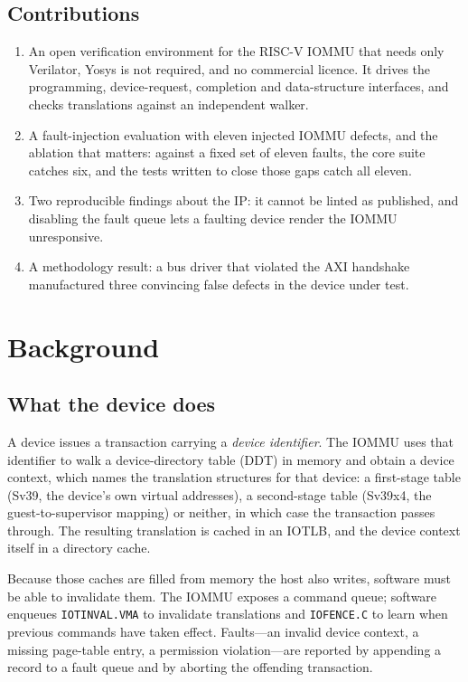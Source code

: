 \documentclass[journal]{IEEEtran}
\newcommand{\cmd}[1]{\mbox{\texttt{#1}}}
\begin{document}
\subsection{Contributions}
\begin{enumerate}
\item An open verification environment for the RISC-V IOMMU that needs only
      Verilator, Yosys is not required, and no commercial licence. It drives the
      programming, device-request, completion and data-structure interfaces, and
      checks translations against an independent walker.
\item A fault-injection evaluation with eleven injected IOMMU defects, and the
      ablation that matters: against a fixed set of eleven faults, the core
      suite catches six, and the tests written to close those gaps catch all
      eleven.
\item Two reproducible findings about the IP: it cannot be linted as published,
      and disabling the fault queue lets a faulting device render the IOMMU
      unresponsive.
\item A methodology result: a bus driver that violated the AXI handshake
      manufactured three convincing false defects in the device under test.
\end{enumerate}

\section{Background}

\subsection{What the device does}
A device issues a transaction carrying a \emph{device identifier}. The IOMMU
uses that identifier to walk a device-directory table (DDT) in memory and
obtain a device context, which names the translation structures for that device:
a first-stage table (Sv39, the device's own virtual addresses), a second-stage
table (Sv39x4, the guest-to-supervisor mapping) or neither, in which case the
transaction passes through. The resulting translation is cached in an IOTLB, and
the device context itself in a directory cache.

Because those caches are filled from memory the host also writes, software must
be able to invalidate them. The IOMMU exposes a command queue; software enqueues
\cmd{IOTINVAL.VMA} to invalidate translations and \cmd{IOFENCE.C} to learn
when previous commands have taken effect. Faults---an invalid device context, a
missing page-table entry, a permission violation---are reported by appending a
record to a fault queue and by aborting the offending transaction.
\end{document}
